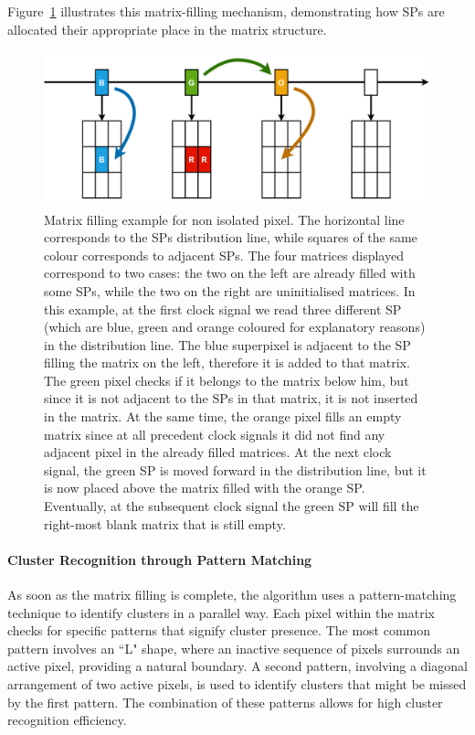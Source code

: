 Figure~\ref{fig:matrix_filling_clustering} illustrates this matrix-filling mechanism, demonstrating how SPs are allocated their appropriate place in the matrix structure.

\begin{figure}
    \centering
    \includegraphics[width=\textwidth]{figures/matrix_filling_clustering.png}
    \caption{Matrix filling example for non isolated pixel. The horizontal line corresponds to the SPs distribution line, while squares of the same colour corresponds to adjacent SPs. The four matrices displayed correspond to two cases: the two on the left are already filled with some SPs, while the two on the right are uninitialised matrices. In this example, at the first clock signal we read three different SP (which are blue, green and orange coloured for explanatory reasons) in the distribution line. The blue superpixel is adjacent to the SP filling the matrix on the left, therefore it is added to that matrix. The green pixel checks if it belongs to the matrix below him, but since it is not adjacent to the SPs in that matrix, it is not inserted in the matrix. At the same time, the orange pixel fills an empty matrix since at all precedent clock signals it did not find any adjacent pixel in the already filled matrices. At the next clock signal, the green SP is moved forward in the distribution line, but it is now placed above the matrix filled with the orange SP. Eventually, at the subsequent clock signal the green SP will fill the right-most blank matrix that is still empty.}
    \label{fig:matrix_filling_clustering}
\end{figure}

\paragraph{Cluster Recognition through Pattern Matching}
As soon as the matrix filling is complete, the algorithm uses a pattern-matching technique to identify clusters in a parallel way. Each pixel within the matrix checks for specific patterns that signify cluster presence. The most common pattern involves an ``L" shape, where an inactive sequence of pixels surrounds an active pixel, providing a natural boundary. A second pattern, involving a diagonal arrangement of two active pixels, is used to identify clusters that might be missed by the first pattern. The combination of these patterns allows for high cluster recognition efficiency.


